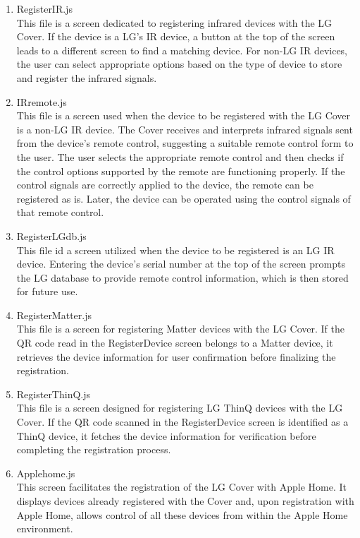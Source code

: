 \documentclass[conference]{IEEEtran}
\begin{document}
\begin{enumerate}[label=\arabic*.]
\begin{enumerate}[label=\alph*.]
\item RegisterIR.js\\
This file is a screen dedicated to registering infrared devices with the LG Cover. If the device is a LG’s IR device, a button at the top of the screen leads to a different screen to find a matching device. For non-LG IR devices, the user can select appropriate options based on the type of device to store and register the infrared signals.\\
\item IRremote.js\\
This file is a screen used when the device to be registered with the LG Cover is a non-LG IR device. The Cover receives and interprets infrared signals sent from the device's remote control, suggesting a suitable remote control form to the user. The user selects the appropriate remote control and then checks if the control options supported by the remote are functioning properly. If the control signals are correctly applied to the device, the remote can be registered as is. Later, the device can be operated using the control signals of that remote control.\\
\item RegisterLGdb.js\\
This file id a screen utilized when the device to be registered is an LG IR device. Entering the device's serial number at the top of the screen prompts the LG database to provide remote control information, which is then stored for future use.\\
\item RegisterMatter.js\\
This file is a screen for registering Matter devices with the LG Cover. If the QR code read in the RegisterDevice screen belongs to a Matter device, it retrieves the device information for user confirmation before finalizing the registration.\\
\item RegisterThinQ.js\\
This file is a screen designed for registering LG ThinQ devices with the LG Cover. If the QR code scanned in the RegisterDevice screen is identified as a ThinQ device, it fetches the device information for verification before completing the registration process.\\
\item Applehome.js\\
This screen facilitates the registration of the LG Cover with Apple Home. It displays devices already registered with the Cover and, upon registration with Apple Home, allows control of all these devices from within the Apple Home environment.\\

\end{enumerate}
\end{enumerate}
\end{document}
